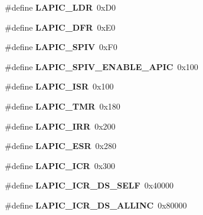 \begin{DoxyCompactItemize}
\#define {\bfseries L\+A\+P\+I\+C\+\_\+\+L\+DR}~0x\+D0
\item 
\mbox{\label{group__i386__apci_gae1d084cddff08a7449ce53b7a0ac9ead}} 
\#define {\bfseries L\+A\+P\+I\+C\+\_\+\+D\+FR}~0x\+E0
\item 
\mbox{\label{group__i386__apci_gae4243c6e6b36f37a657153b790006414}} 
\#define {\bfseries L\+A\+P\+I\+C\+\_\+\+S\+P\+IV}~0x\+F0
\item 
\mbox{\label{group__i386__apci_ga2db19dcd9d93199fb332baa352998d46}} 
\#define {\bfseries L\+A\+P\+I\+C\+\_\+\+S\+P\+I\+V\+\_\+\+E\+N\+A\+B\+L\+E\+\_\+\+A\+P\+IC}~0x100
\item 
\mbox{\label{group__i386__apci_ga562e50d87fe90d0873fc8c5c93aff589}} 
\#define {\bfseries L\+A\+P\+I\+C\+\_\+\+I\+SR}~0x100
\item 
\mbox{\label{group__i386__apci_ga9743420cb98d40c074be559ce03da6bf}} 
\#define {\bfseries L\+A\+P\+I\+C\+\_\+\+T\+MR}~0x180
\item 
\mbox{\label{group__i386__apci_ga0e385e6b0b20db210a027b56db525fa8}} 
\#define {\bfseries L\+A\+P\+I\+C\+\_\+\+I\+RR}~0x200
\item 
\mbox{\label{group__i386__apci_ga8059ffe66a7aec7306994ae4cd90e227}} 
\#define {\bfseries L\+A\+P\+I\+C\+\_\+\+E\+SR}~0x280
\item 
\mbox{\label{group__i386__apci_ga24d80ea7dbc6292e2358a078db2dd983}} 
\#define {\bfseries L\+A\+P\+I\+C\+\_\+\+I\+CR}~0x300
\item 
\mbox{\label{group__i386__apci_gaab137845c73b76074cec531c3e43c186}} 
\#define {\bfseries L\+A\+P\+I\+C\+\_\+\+I\+C\+R\+\_\+\+D\+S\+\_\+\+S\+E\+LF}~0x40000
\item 
\mbox{\label{group__i386__apci_ga375722b9babe5923c233da0971d22619}} 
\#define {\bfseries L\+A\+P\+I\+C\+\_\+\+I\+C\+R\+\_\+\+D\+S\+\_\+\+A\+L\+L\+I\+NC}~0x80000
\item 
\mbox{\label{group__i386__apci_gaadb4f295eed1b5b0a1a9b1978bda08f2}} 

\end{DoxyCompactItemize}
